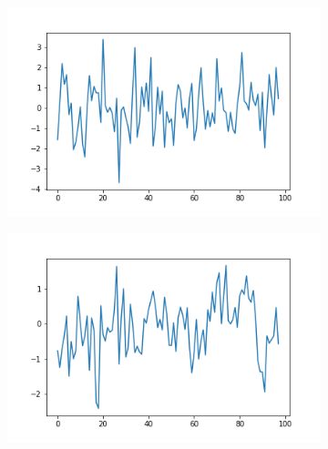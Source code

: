 \begin{figure}
  \centering
  \begin{subfigure}[t]{0.45\textwidth}
  \centering
    \includegraphics[width=\linewidth]{proba_00}
    \caption{
    }
    \label{fig:analysis-svc-proba-00}
  \end{subfigure}%
  \begin{subfigure}[t]{0.45\textwidth}
  \centering
    \includegraphics[width=\linewidth]{proba_21}
    \caption{
    }
    \label{fig:analysis-svc-proba-21}
  \end{subfigure}


\end{figure}
